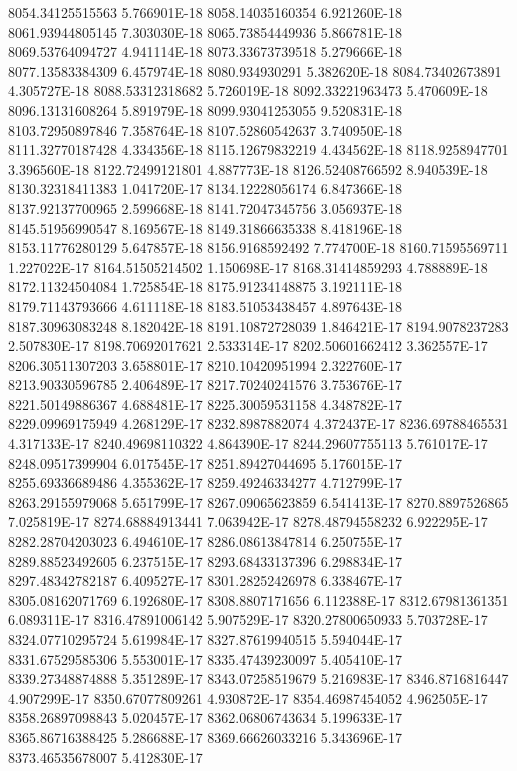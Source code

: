 8054.34125515563  5.766901E-18
8058.14035160354  6.921260E-18
8061.93944805145  7.303030E-18
8065.73854449936  5.866781E-18
8069.53764094727  4.941114E-18
8073.33673739518  5.279666E-18
8077.13583384309  6.457974E-18
8080.934930291  5.382620E-18
8084.73402673891  4.305727E-18
8088.53312318682  5.726019E-18
8092.33221963473  5.470609E-18
8096.13131608264  5.891979E-18
8099.93041253055  9.520831E-18
8103.72950897846  7.358764E-18
8107.52860542637  3.740950E-18
8111.32770187428  4.334356E-18
8115.12679832219  4.434562E-18
8118.9258947701  3.396560E-18
8122.72499121801  4.887773E-18
8126.52408766592  8.940539E-18
8130.32318411383  1.041720E-17
8134.12228056174  6.847366E-18
8137.92137700965  2.599668E-18
8141.72047345756  3.056937E-18
8145.51956990547  8.169567E-18
8149.31866635338  8.418196E-18
8153.11776280129  5.647857E-18
8156.9168592492  7.774700E-18
8160.71595569711  1.227022E-17
8164.51505214502  1.150698E-17
8168.31414859293  4.788889E-18
8172.11324504084  1.725854E-18
8175.91234148875  3.192111E-18
8179.71143793666  4.611118E-18
8183.51053438457  4.897643E-18
8187.30963083248  8.182042E-18
8191.10872728039  1.846421E-17
8194.9078237283  2.507830E-17
8198.70692017621  2.533314E-17
8202.50601662412  3.362557E-17
8206.30511307203  3.658801E-17
8210.10420951994  2.322760E-17
8213.90330596785  2.406489E-17
8217.70240241576  3.753676E-17
8221.50149886367  4.688481E-17
8225.30059531158  4.348782E-17
8229.09969175949  4.268129E-17
8232.8987882074  4.372437E-17
8236.69788465531  4.317133E-17
8240.49698110322  4.864390E-17
8244.29607755113  5.761017E-17
8248.09517399904  6.017545E-17
8251.89427044695  5.176015E-17
8255.69336689486  4.355362E-17
8259.49246334277  4.712799E-17
8263.29155979068  5.651799E-17
8267.09065623859  6.541413E-17
8270.8897526865  7.025819E-17
8274.68884913441  7.063942E-17
8278.48794558232  6.922295E-17
8282.28704203023  6.494610E-17
8286.08613847814  6.250755E-17
8289.88523492605  6.237515E-17
8293.68433137396  6.298834E-17
8297.48342782187  6.409527E-17
8301.28252426978  6.338467E-17
8305.08162071769  6.192680E-17
8308.8807171656  6.112388E-17
8312.67981361351  6.089311E-17
8316.47891006142  5.907529E-17
8320.27800650933  5.703728E-17
8324.07710295724  5.619984E-17
8327.87619940515  5.594044E-17
8331.67529585306  5.553001E-17
8335.47439230097  5.405410E-17
8339.27348874888  5.351289E-17
8343.07258519679  5.216983E-17
8346.8716816447  4.907299E-17
8350.67077809261  4.930872E-17
8354.46987454052  4.962505E-17
8358.26897098843  5.020457E-17
8362.06806743634  5.199633E-17
8365.86716388425  5.286688E-17
8369.66626033216  5.343696E-17
8373.46535678007  5.412830E-17
